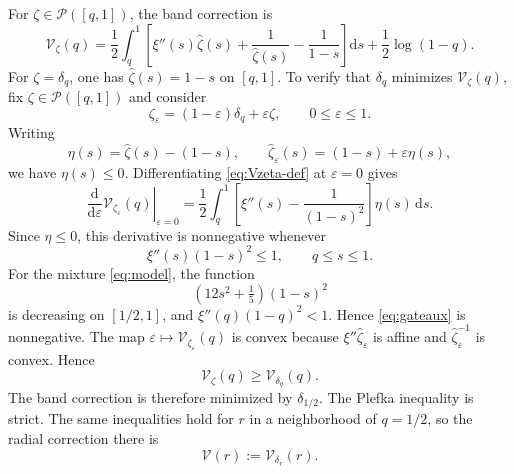 \documentclass[a4paper,10pt,reqno]{amsart}
\numberwithin{equation}{section}
\newcommand{\mc}{\mathcal}
\newcommand{\dd}{\mathrm{d}}
\newcommand{\zhat}{\widehat\zeta}
\begin{document}
	For \(\zeta\in\mc P([q,1])\), the band correction is
	\begin{equation}\label{eq:Vzeta-def}
		\mathcal V_\zeta(q)
		=
		\frac12\int_q^1
		\left[
		\xi''(s)\zhat(s)+\frac1{\zhat(s)}-\frac1{1-s}
		\right]\dd s
		+\frac12\log(1-q).
	\end{equation}
	For \(\zeta=\delta_q\), one has \(\zhat(s)=1-s\) on \([q,1]\). To verify
	that \(\delta_q\) minimizes \(\mathcal V_\zeta(q)\), fix
	\(\zeta\in\mc P([q,1])\) and consider
	\[
	\zeta_\varepsilon=(1-\varepsilon)\delta_q+\varepsilon\zeta,
	\qquad 0\le\varepsilon\le1.
	\]
	Writing
	\[
	\eta(s)=\zhat(s)-(1-s),
	\qquad
	\zhat_\varepsilon(s)=(1-s)+\varepsilon\eta(s),
	\]
	we have \(\eta(s)\le0\).
	Differentiating \eqref{eq:Vzeta-def} at \(\varepsilon=0\) gives
	\begin{equation}\label{eq:gateaux}
		\left.\frac{\dd}{\dd\varepsilon}
		\mathcal V_{\zeta_\varepsilon}(q)\right|_{\varepsilon=0}
		=
		\frac12\int_q^1
		\left[\xi''(s)-\frac1{(1-s)^2}\right]\eta(s)\,\dd s.
	\end{equation}
	Since \(\eta\le0\), this derivative is nonnegative whenever
	\[
	\xi''(s)(1-s)^2\le1,
	\qquad q\le s\le1.
	\]
	For the mixture \eqref{eq:model}, the function
	\[
	\left(12s^2+\tfrac15\right)(1-s)^2
	\]
	is decreasing on \([1/2,1]\), and \(\xi''(q)(1-q)^2<1\). Hence
	\eqref{eq:gateaux} is nonnegative. The map
	\(\varepsilon\mapsto\mathcal V_{\zeta_\varepsilon}(q)\) is convex because
	\(\xi''\zhat_\varepsilon\) is affine and
	\(\zhat_\varepsilon^{-1}\) is convex. Hence
	\[
	\mathcal V_\zeta(q)\ge\mathcal V_{\delta_q}(q).
	\]
	The band correction is therefore minimized by \(\delta_{1/2}\). The Plefka
	inequality is strict. The same inequalities hold for \(r\) in a
	neighborhood of \(q=1/2\), so the radial correction there is
	\[
	\mathcal V(r):=\mathcal V_{\delta_r}(r).
	\]
	
\end{document}
